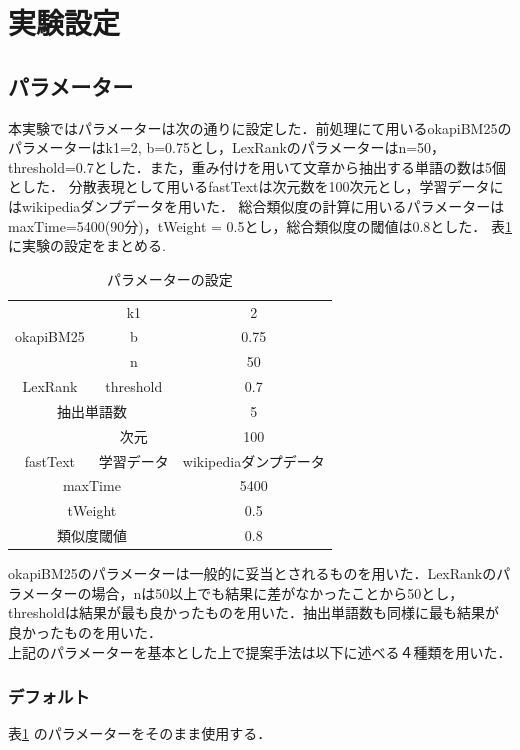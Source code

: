 \section{実験設定}
\label{exp:setting}
\subsection{パラメーター}
本実験ではパラメーターは次の通りに設定した．前処理にて用いるokapiBM25のパラメーターはk1=2, b=0.75とし，LexRankのパラメーターはn=50，threshold=0.7とした．また，重み付けを用いて文章から抽出する単語の数は5個とした．
分散表現として用いるfastTextは次元数を100次元とし，学習データにはwikipediaダンプデータを用いた．
総合類似度の計算に用いるパラメーターはmaxTime=5400(90分)，tWeight = 0.5とし，総合類似度の閾値は0.8とした．
表\ref{table:par} に実験の設定をまとめる.
\begin{table}[htbp]
\begin{center}
  \begin{tabular}{| c | c |  c |} \hline
      & k1 &  2 \\ \cline{2-3}
    okapiBM25 & b & 0.75 \\ \cline{2-3} \hline
     & n &  50 \\ \cline{2-3}
    LexRank & threshold & 0.7 \\ \cline{2-3} \hline
     \multicolumn{2}{|c|}{抽出単語数} & 5 \\  \hline
     & 次元 &  100 \\ \cline{2-3} 
    fastText & 学習データ & wikipediaダンプデータ \\ \cline{2-3} \hline
     \multicolumn{2}{|c|}{maxTime} & 5400 \\  \hline
     \multicolumn{2}{|c|}{tWeight} & 0.5 \\  \hline
     \multicolumn{2}{|c|}{類似度閾値} & 0.8 \\  \hline
  \end{tabular}
  \caption{パラメーターの設定}
  \label{table:par}
  \end{center}
\end{table}

okapiBM25のパラメーターは一般的に妥当とされる\cite{infoRetrieval}ものを用いた．LexRankのパラメーターの場合，nは50以上でも結果に差がなかったことから50とし，thresholdは結果が最も良かったものを用いた．抽出単語数も同様に最も結果が良かったものを用いた．
\\
上記のパラメーターを基本とした上で提案手法は以下に述べる４種類を用いた．
\subsubsection*{ デフォルト}
表\ref{table:par} のパラメーターをそのまま使用する．

